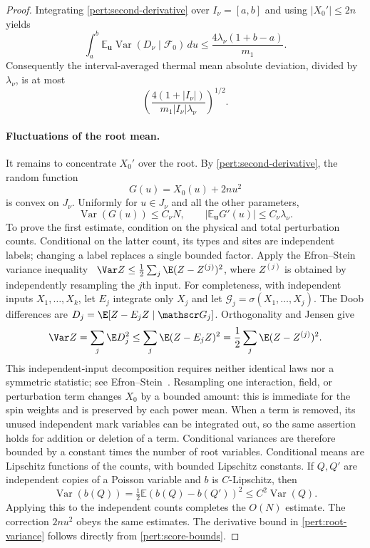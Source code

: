 \begin{proof}
Integrating \eqref{pert:second-derivative} over $I_\nu=[a,b]$ and using
$|X_0'|\leq2n$ yields
\begin{equation}
 \int_a^b\mathbb E_{\mathbf u}
       \operatorname{Var}(D_\nu\mid\mathscr F_0)\,du
 \leq\frac{4\lambda_\nu(1+b-a)}{m_1}.
 \label{pert:thermal-variance}
\end{equation}
Consequently the interval-averaged thermal mean absolute deviation,
divided by $\lambda_\nu$, is at most
\begin{equation}
 \left(\frac{4(1+|I_\nu|)}
 {m_1|I_\nu|\lambda_\nu}\right)^{1/2}.
 \label{pert:thermal-bound}
\end{equation}

\paragraph{Fluctuations of the root mean.}
It remains to concentrate $X_0'$ over the root. By
\eqref{pert:second-derivative}, the random function
\[
 G(u)=X_0(u)+2nu^2
\]
is convex on $J_\nu$.  Uniformly for $u\in J_\nu$ and all the other
parameters,
\begin{equation}
 \operatorname{Var}(G(u))\leq C_\nu N,
 \qquad |\mathbb E_{\mathbf u}G'(u)|\leq C_\nu\lambda_\nu.
 \label{pert:root-variance}
\end{equation}
To prove the first estimate, condition on the physical and total
perturbation counts. Conditional on the latter count, its types and sites
are independent labels; changing a label replaces a single bounded
factor. Apply the Efron--Stein variance inequality~\cite{EfronStein}
$\Var Z\le\frac12\sum_j\E(Z-Z^{(j)})^2$, where $Z^{(j)}$ is obtained
by independently resampling the $j$th input. For completeness, with
independent inputs $X_1,\ldots,X_k$, let $E_j$ integrate only $X_j$ and
let $\mathscr G_j=\sigma(X_1,\ldots,X_j)$. The Doob differences are
$D_j=\E[Z-E_jZ\mid\mathscr G_j]$. Orthogonality and Jensen give
\[
 \Var Z=\sum_j\E D_j^2
 \le\sum_j\E(Z-E_jZ)^2
 =\frac12\sum_j\E(Z-Z^{(j)})^2.
\]
This independent-input decomposition requires neither identical laws
nor a symmetric statistic; see Efron--Stein~\cite[Section~2]{EfronStein}.
Resampling one interaction, field, or
perturbation term changes $X_0$ by a bounded amount: this is immediate
for the spin weights and is preserved by each power mean.  When a term
is removed, its unused independent mark variables can be integrated
out, so the same assertion holds for addition or deletion of a term.
Conditional variances are therefore bounded by a constant times the
number of root variables.  Conditional means are Lipschitz functions
of the counts, with bounded Lipschitz constants.  If $Q,Q'$ are
independent copies of a Poisson variable and $b$ is $C$-Lipschitz, then
\[
 \operatorname{Var}(b(Q))
 =\tfrac12\mathbb E(b(Q)-b(Q'))^2
 \leq C^2\operatorname{Var}(Q).
\]
Applying this to the independent counts completes the $O(N)$ estimate.
The correction $2nu^2$ obeys the same estimates.  The derivative bound
in \eqref{pert:root-variance} follows directly from
\eqref{pert:score-bounds}.


\end{proof}
